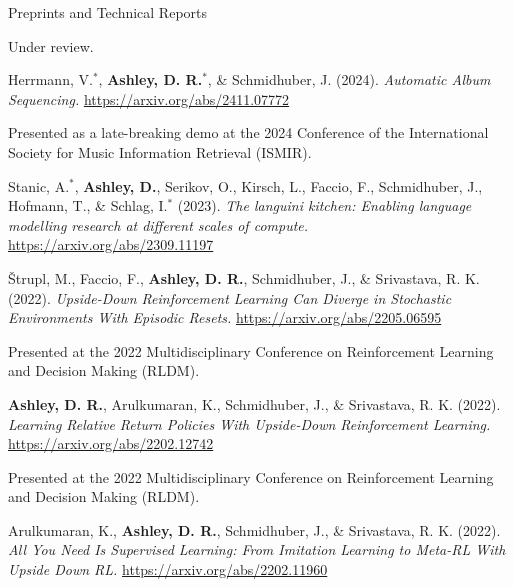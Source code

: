 \documentclass[a4paper,dateabbrev]{cv}
\begin{document}
\begin{rSection}{Preprints and Technical Reports}
\begin{rPublications}
        \nopagebreak\vspace{-0.4em}\nopagebreak
        Under review.
    \item \label{pub:herrmann2024automatic}
        Herrmann, V.$^*$, \textbf{Ashley, D. R.}$^*$, \& Schmidhuber, J.
        (2024).
        \textit{Automatic Album Sequencing.}
        \url{https://arxiv.org/abs/2411.07772}

        \nopagebreak\vspace{-0.4em}\nopagebreak
        Presented as a late-breaking demo at the 2024 Conference of the International Society for Music Information Retrieval (ISMIR).
    \item \label{pub:stanic2023languini}
        Stanic, A.$^*$, \textbf{Ashley, D.}, Serikov, O., Kirsch, L., Faccio, F., Schmidhuber, J., Hofmann, T., \& Schlag, I.$^*$
        (2023).
        \textit{The languini kitchen: Enabling language modelling research at different scales of compute.}
        \url{https://arxiv.org/abs/2309.11197}
    \item \label{pub:strupl2022upside}
        {\v{S}}trupl, M., Faccio, F., \textbf{Ashley, D. R.}, Schmidhuber, J., \& Srivastava, R. K.
        (2022).
        \textit{Upside-Down Reinforcement Learning Can Diverge in Stochastic Environments With Episodic Resets.}
        \url{https://arxiv.org/abs/2205.06595}

        \nopagebreak\vspace{-0.4em}\nopagebreak
        Presented at the 2022 Multidisciplinary Conference on Reinforcement Learning and Decision Making (RLDM).
    \item \label{pub:ashley2022learning}
        \textbf{Ashley, D. R.}, Arulkumaran, K., Schmidhuber, J., \& Srivastava, R. K.
        (2022).
        \textit{Learning Relative Return Policies With Upside-Down Reinforcement Learning.}
        \url{https://arxiv.org/abs/2202.12742}

        \nopagebreak\vspace{-0.4em}\nopagebreak
        Presented at the 2022 Multidisciplinary Conference on Reinforcement Learning and Decision Making (RLDM).
    \item \label{pub:arulkumaran2022all}
        Arulkumaran, K., \textbf{Ashley, D. R.}, Schmidhuber, J., \& Srivastava, R. K.
        (2022).
        \textit{All You Need Is Supervised Learning: From Imitation Learning to Meta-RL With Upside Down RL.}
        \url{https://arxiv.org/abs/2202.11960}


\end{rPublications}
\end{rSection}
\end{document}
